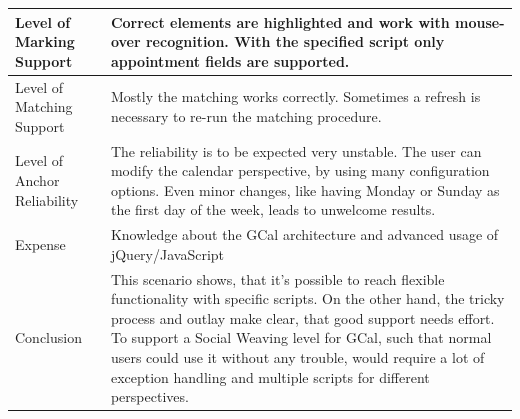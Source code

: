 \begin{tabular}{|p{}| p{} |}
\hline 
Level of Marking Support & Correct elements are highlighted and work with mouse-over recognition. With the specified script only appointment fields are supported.\\ 
\hline 
Level of Matching Support & Mostly the matching works correctly. Sometimes a refresh is necessary to re-run the matching procedure. \\ 
\hline 
Level of Anchor Reliability & The reliability is to be expected very unstable. The user can modify the calendar perspective, by using many configuration options. Even minor changes, like having Monday or Sunday as the first day of the week, leads to unwelcome results. \\ 
\hline 
Expense & Knowledge about the GCal architecture and advanced usage of jQuery/JavaScript \\ 
\hline 
Conclusion & This scenario shows, that it's possible to reach flexible functionality with specific scripts. On the other hand, the tricky process and outlay make clear, that good support needs effort. To support a Social Weaving level for GCal, such that normal users could use it without any trouble, would require a lot of exception handling and multiple scripts for different perspectives. \\ 
\hline 
\end{tabular}